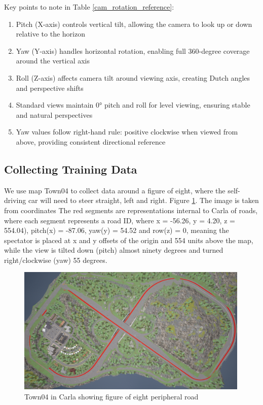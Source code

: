 Key points to note in Table \ref{cam_rotation_reference}:
\begin{enumerate}
    \item Pitch (X-axis) controls vertical tilt, allowing the camera to look up or down relative to the horizon
    \item Yaw (Y-axis) handles horizontal rotation, enabling full 360-degree coverage around the vertical axis
    \item Roll (Z-axis) affects camera tilt around viewing axis, creating Dutch angles and perspective shifts
    \item Standard views maintain 0° pitch and roll for level viewing, ensuring stable and natural perspectives
    \item Yaw values follow right-hand rule: positive clockwise when viewed from above, providing consistent directional reference
\end{enumerate}

\subsection{Collecting Training Data}

We use map Town04 to collect data around a figure of eight, where the self-driving car will need to steer straight, left and right. Figure \ref{fig:Town04FigureOfEight}. The image is taken from coordinates The red segments are representations internal to Carla of roads, where each segment represents a road ID, where x = -56.26, y = 4.20, z = 554.04),  pitch(x) = -87.06, yaw(y) = 54.52 and row(z) =  0, meaning the spectator is placed at x and y offsets of the origin and 554 units above the map, while the view is tilted down (pitch) almost ninety degrees and turned right/clockwise (yaw) 55 degrees. 


\begin{figure}[h]
    \centering
    \includegraphics[width=0.99\textwidth]{Figures/Methods/Town04FigureOfEight.png}
    \caption{Town04 in Carla showing figure of eight peripheral road}
    \label{fig:Town04FigureOfEight}
\end{figure}

